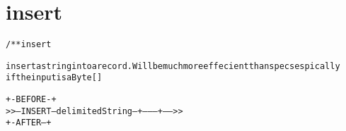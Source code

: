 \section{insert}
\begin{shaded}
\begin{alltt}
/** insert

insert a string into a record.  Will be much more effecient than specs espically
if the input is a Byte[]

                              +-BEFORE-+
 >>--INSERT--delimitedString--+--------+----->>
                              +-AFTER--+


\end{alltt}
\end{shaded}
